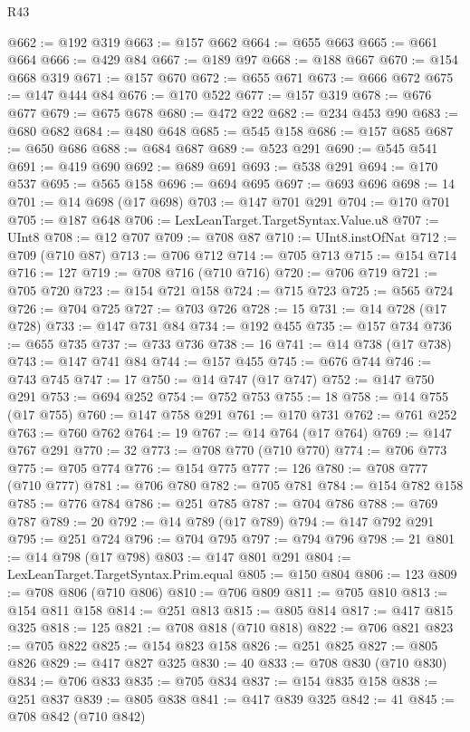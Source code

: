 \begin{lexlean}{R43}
\begin{coremodule}
@662 := @192 @319
@663 := @157 @662
@664 := @655 @663
@665 := @661 @664
@666 := @429 @84
@667 := @189 @97
@668 := @188 @667
@670 := @154 @668 @319
@671 := @157 @670
@672 := @655 @671
@673 := @666 @672
@675 := @147 @444 @84
@676 := @170 @522
@677 := @157 @319
@678 := @676 @677
@679 := @675 @678
@680 := @472 @22
@682 := @234 @453 @90
@683 := @680 @682
@684 := @480 @648
@685 := @545 @158
@686 := @157 @685
@687 := @650 @686
@688 := @684 @687
@689 := @523 @291
@690 := @545 @541
@691 := @419 @690
@692 := @689 @691
@693 := @538 @291
@694 := @170 @537
@695 := @565 @158
@696 := @694 @695
@697 := @693 @696
@698 := 14
@701 := @14 @698 (@17 @698)
@703 := @147 @701 @291
@704 := @170 @701
@705 := @187 @648
@706 := LexLeanTarget.TargetSyntax.Value.u8
@707 := UInt8
@708 := @12 @707
@709 := @708 @87
@710 := UInt8.instOfNat
@712 := @709 (@710 @87)
@713 := @706 @712
@714 := @705 @713
@715 := @154 @714
@716 := 127
@719 := @708 @716 (@710 @716)
@720 := @706 @719
@721 := @705 @720
@723 := @154 @721 @158
@724 := @715 @723
@725 := @565 @724
@726 := @704 @725
@727 := @703 @726
@728 := 15
@731 := @14 @728 (@17 @728)
@733 := @147 @731 @84
@734 := @192 @455
@735 := @157 @734
@736 := @655 @735
@737 := @733 @736
@738 := 16
@741 := @14 @738 (@17 @738)
@743 := @147 @741 @84
@744 := @157 @455
@745 := @676 @744
@746 := @743 @745
@747 := 17
@750 := @14 @747 (@17 @747)
@752 := @147 @750 @291
@753 := @694 @252
@754 := @752 @753
@755 := 18
@758 := @14 @755 (@17 @755)
@760 := @147 @758 @291
@761 := @170 @731
@762 := @761 @252
@763 := @760 @762
@764 := 19
@767 := @14 @764 (@17 @764)
@769 := @147 @767 @291
@770 := 32
@773 := @708 @770 (@710 @770)
@774 := @706 @773
@775 := @705 @774
@776 := @154 @775
@777 := 126
@780 := @708 @777 (@710 @777)
@781 := @706 @780
@782 := @705 @781
@784 := @154 @782 @158
@785 := @776 @784
@786 := @251 @785
@787 := @704 @786
@788 := @769 @787
@789 := 20
@792 := @14 @789 (@17 @789)
@794 := @147 @792 @291
@795 := @251 @724
@796 := @704 @795
@797 := @794 @796
@798 := 21
@801 := @14 @798 (@17 @798)
@803 := @147 @801 @291
@804 := LexLeanTarget.TargetSyntax.Prim.equal
@805 := @150 @804
@806 := 123
@809 := @708 @806 (@710 @806)
@810 := @706 @809
@811 := @705 @810
@813 := @154 @811 @158
@814 := @251 @813
@815 := @805 @814
@817 := @417 @815 @325
@818 := 125
@821 := @708 @818 (@710 @818)
@822 := @706 @821
@823 := @705 @822
@825 := @154 @823 @158
@826 := @251 @825
@827 := @805 @826
@829 := @417 @827 @325
@830 := 40
@833 := @708 @830 (@710 @830)
@834 := @706 @833
@835 := @705 @834
@837 := @154 @835 @158
@838 := @251 @837
@839 := @805 @838
@841 := @417 @839 @325
@842 := 41
@845 := @708 @842 (@710 @842)

\end{coremodule}
\end{lexlean}
